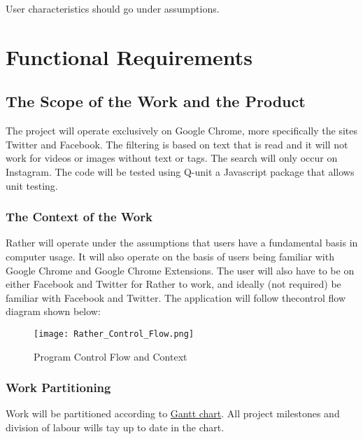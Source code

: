 \documentclass[12pt, titlepage]{article}
\begin{document}
User characteristics should go under assumptions. %

\section{Functional Requirements}


\subsection{The Scope of the Work and the Product}
The project will operate exclusively on Google Chrome, more specifically the sites Twitter and Facebook. The filtering is based on text that is read and it will not work for videos or images without text or tags. The search will only occur on Instagram. The code will be tested using Q-unit a Javascript package that allows unit testing.

\subsubsection{The Context of the Work}
Rather will operate under the assumptions that users have a fundamental basis in computer usage. It will also operate on the basis of users being familiar with Google Chrome and Google Chrome Extensions. The user will also have to be on either Facebook and Twitter for Rather to work, and ideally (not required) be familiar with Facebook and Twitter. The application will follow thecontrol flow diagram shown below:
\begin{figure}
  \texttt{[image: Rather\_Control\_Flow.png]}
  \caption{Program Control Flow and Context}
  \label{fig:Control Flow Diagram}
\end{figure}


\subsubsection{Work Partitioning}
Work will be partitioned according to \href{../DevelopmentPlan/Dev_Plan_Rev0.gan}{Gantt chart}. All project milestones and division of labour wills tay up to date in the chart.
\end{document}
